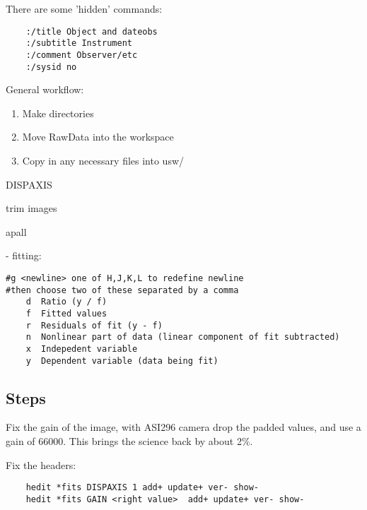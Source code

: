 There are some 'hidden' commands:

\begingroup \fontsize{10pt}{10pt}
\selectfont
\begin{verbatim} 
    :/title Object and dateobs
    :/subtitle Instrument
    :/comment Observer/etc
    :/sysid no
\end{verbatim}
\endgroup


General workflow:
\vspace{-.15cm}
\begin{enumerate}\addtolength{\itemsep}{-0.5\baselineskip}
   \item   Make directories
   \item   Move RawData into the workspace
   \item   Copy in any necessary files into usw/
\end{enumerate}


DISPAXIS

trim images


apall

- fitting:

\begingroup \fontsize{10pt}{10pt}
\selectfont
\begin{verbatim} 
#g <newline> one of H,J,K,L to redefine newline
#then choose two of these separated by a comma
    d  Ratio (y / f)
    f  Fitted values
    r  Residuals of fit (y - f)
    n  Nonlinear part of data (linear component of fit subtracted)
    x  Indepedent variable
    y  Dependent variable (data being fit)
\end{verbatim}
\endgroup


\subsection{Steps}

Fix the gain of the image, with ASI296 camera drop the padded
values, and use a gain of 66000. This brings the science back
by about 2\%.

Fix the headers:


\begingroup \fontsize{10pt}{10pt}
\selectfont
\begin{verbatim} 
    hedit *fits DISPAXIS 1 add+ update+ ver- show-
    hedit *fits GAIN <right value>  add+ update+ ver- show-
\end{verbatim}
\endgroup


